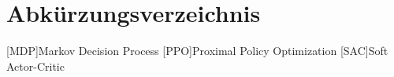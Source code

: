 \chapter*{Abkürzungsverzeichnis}

\begin{acronym}[PPO] %

	[MDP]{Markov Decision Process}
	[PPO]{Proximal Policy Optimization}
	[SAC]{Soft Actor-Critic}

\end{acronym}